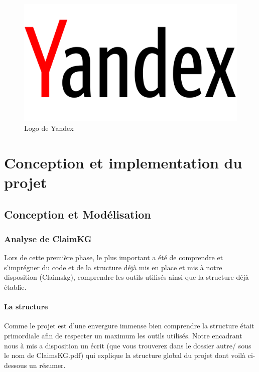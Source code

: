 \documentclass[oneside,13pt,a4paper]{report}
\begin{document}
\begin{figure}[h]
\begin{minipage}[c]{.30\linewidth}
	\end{minipage}
	\hfill%
	\begin{minipage}[c]{.30\linewidth}
		\centering
		\includegraphics[width=1\textwidth]{img/yandex.png}
		\caption{Logo de Yandex}
	\end{minipage}
\end{figure}

\chapter{Conception et implementation du projet}

\section{Conception et Modélisation}

\subsection{Analyse de ClaimKG}

Lors de cette première phase, le plus important a été de comprendre et s'imprégner du code et de la structure déjà mis en place et mis à notre disposition (Claimskg), comprendre les outils utilisés ainsi que la structure déjà établie.

\subsubsection*{La structure}

Comme le projet est d'une envergure immense bien comprendre la structure était primordiale afin de respecter un maximum les outils utilisés. Notre encadrant nous à mis a disposition un écrit (que vous trouverez dans le dossier autre/ sous le nom de ClaimsKG.pdf) qui explique la structure global du projet dont voilà ci-dessous un résumer.
\end{document}
